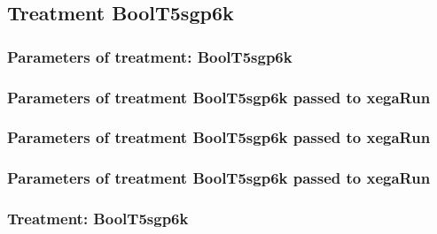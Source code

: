\documentclass[18pt,c]{beamer}
\begin{document}
\clearpage
\subsection{Treatment BoolT5sgp6k}

 \begin{frame}
 \fontsize{8pt}{9pt}\selectfont
 \frametitle{  Parameters of treatment: BoolT5sgp6k 
 }

 \label{ExpFtParmTable028.tex}  
 \end{frame}


 \begin{frame}
 \fontsize{8pt}{9pt}\selectfont
 \frametitle{  Parameters of treatment BoolT5sgp6k passed to xegaRun
 }

 \label{ExpFtParmTable029.tex}  
 \end{frame}


 \begin{frame}
 \fontsize{8pt}{9pt}\selectfont
 \frametitle{  Parameters of treatment BoolT5sgp6k passed to xegaRun
 }

 \label{ExpFtParmTable030.tex}  
 \end{frame}


 \begin{frame}
 \fontsize{8pt}{9pt}\selectfont
 \frametitle{  Parameters of treatment BoolT5sgp6k passed to xegaRun
 }

 \label{ExpFtParmTable031.tex}  
 \end{frame}

 \begin{frame}
 \fontsize{8pt}{9pt}\selectfont
 \frametitle{ Treatment: BoolT5sgp6k }

 \label{ExpFStatsTable010.tex}  
 \end{frame}
\end{document}
